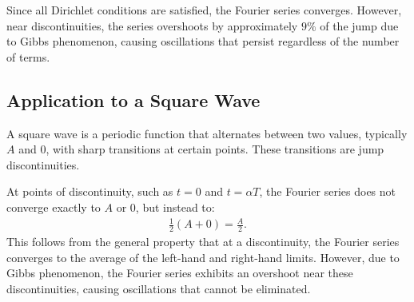 \documentclass[12pt,a4paper]{report}
\begin{document}
Since all Dirichlet conditions are satisfied, the Fourier series converges. However, near discontinuities, the series overshoots by approximately $ 9\% $ of the jump due to Gibbs phenomenon, causing oscillations that persist regardless of the number of terms.


\subsection{Application to a Square Wave}

A square wave is a periodic function that alternates between two values, typically $ A $ and $ 0 $, with sharp transitions at certain points. These transitions are jump discontinuities. 

At points of discontinuity, such as $ t = 0 $ and $ t = \alpha T $, the Fourier series does not converge exactly to $ A $ or $ 0 $, but instead to:
\begin{align}
\frac{1}{2} \left( A + 0 \right) = \frac{A}{2}.
\end{align}
This follows from the general property that at a discontinuity, the Fourier series converges to the average of the left-hand and right-hand limits. However, due to Gibbs phenomenon, the Fourier series exhibits an overshoot near these discontinuities, causing oscillations that cannot be eliminated.\\
\end{document}
